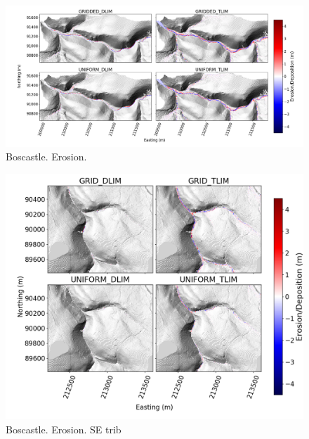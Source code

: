%
%

\begin{figure}
\includegraphics[width=25cm]{chp06_figures_scripts/figure_boscastle_erosion_diff_ensemble.png}
\caption{Boscastle. Erosion.}
\label{fig_boscastle_2dplan_erosion_ensemble}
\end{figure}

\begin{figure}
\includegraphics[width=18cm]{chp06_figures_scripts/figure_boscastle_erosion_diff_ensemble_SE.png}
\caption{Boscastle. Erosion. SE trib}
\label{fig_boscastle_2dplan_erosion_ensemble_SE}
\end{figure}

